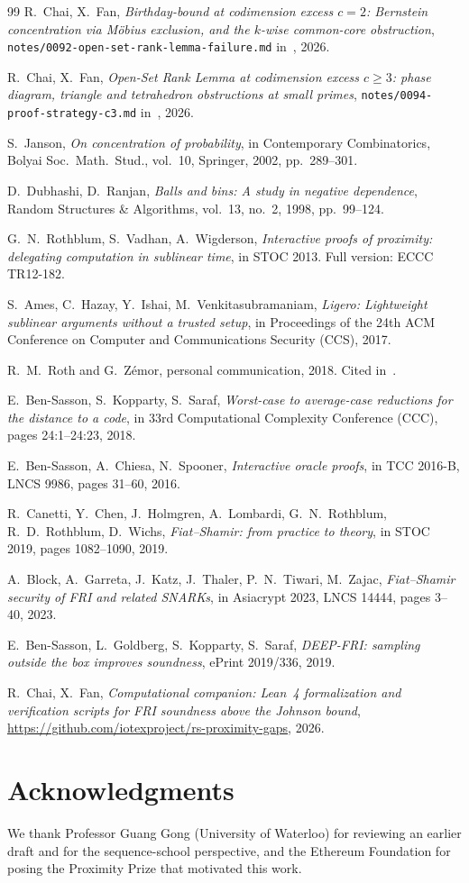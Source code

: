 \documentclass[11pt]{article}
\begin{document}
\begin{thebibliography}{99}
 R.~Chai, X.~Fan, \emph{Birthday-bound at codimension excess $c=2$: Bernstein concentration via M\"obius exclusion, and the $k$-wise common-core obstruction}, \texttt{notes/0092-open-set-rank-lemma-failure.md} in~\cite{CompanionRepo}, 2026.

 R.~Chai, X.~Fan, \emph{Open-Set Rank Lemma at codimension excess $c \geq 3$: phase diagram, triangle and tetrahedron obstructions at small primes}, \texttt{notes/0094-proof-strategy-c3.md} in~\cite{CompanionRepo}, 2026.

 S.~Janson, \emph{On concentration of probability}, in Contemporary Combinatorics, Bolyai Soc.\ Math.\ Stud., vol.~10, Springer, 2002, pp.~289--301.

 D.~Dubhashi, D.~Ranjan, \emph{Balls and bins: A study in negative dependence}, Random Structures \& Algorithms, vol.~13, no.~2, 1998, pp.~99--124.

 G.~N.~Rothblum, S.~Vadhan, A.~Wigderson, \emph{Interactive proofs of proximity: delegating computation in sublinear time}, in STOC 2013. Full version: ECCC TR12-182.

 S.~Ames, C.~Hazay, Y.~Ishai, M.~Venkitasubramaniam, \emph{Ligero: Lightweight sublinear arguments without a trusted setup}, in Proceedings of the 24th ACM Conference on Computer and Communications Security (CCS), 2017.

 R.~M.~Roth and G.~Z\'emor, personal communication, 2018. Cited in~\cite{BCIKS}.

 E.~Ben-Sasson, S.~Kopparty, S.~Saraf, \emph{Worst-case to average-case reductions for the distance to a code}, in 33rd Computational Complexity Conference (CCC), pages 24:1--24:23, 2018.

 E.~Ben-Sasson, A.~Chiesa, N.~Spooner, \emph{Interactive oracle proofs}, in TCC 2016-B, LNCS 9986, pages 31--60, 2016.

 R.~Canetti, Y.~Chen, J.~Holmgren, A.~Lombardi, G.~N.~Rothblum, R.~D.~Rothblum, D.~Wichs, \emph{Fiat--Shamir: from practice to theory}, in STOC 2019, pages 1082--1090, 2019.

 A.~Block, A.~Garreta, J.~Katz, J.~Thaler, P.~N.~Tiwari, M.~Zajac, \emph{Fiat--Shamir security of FRI and related SNARKs}, in Asiacrypt 2023, LNCS 14444, pages 3--40, 2023.

 E.~Ben-Sasson, L.~Goldberg, S.~Kopparty, S.~Saraf, \emph{DEEP-FRI: sampling outside the box improves soundness}, ePrint 2019/336, 2019.

 R.~Chai, X.~Fan, \emph{Computational companion: Lean~4 formalization and verification scripts for FRI soundness above the Johnson bound}, \url{https://github.com/iotexproject/rs-proximity-gaps}, 2026.

\end{thebibliography}

\section*{Acknowledgments}

We thank Professor Guang Gong (University of Waterloo) for reviewing an earlier draft and for the sequence-school perspective, and the Ethereum Foundation for posing the Proximity Prize that motivated this work.
\end{document}
